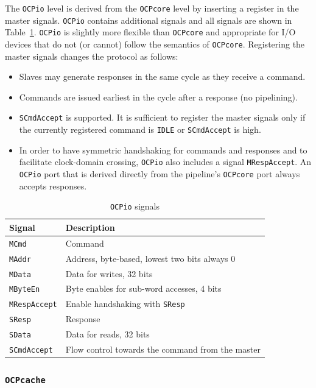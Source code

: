 \documentclass[a4paper,fontsize=10pt,twoside,DIV15,BCOR12mm,headinclude=true,footinclude=false,pagesize,bibtotoc]{scrbook}
\newcommand{\code}[1]{{\texttt{#1}}}
\begin{document}
The \code{OCPio} level is derived from the \code{OCPcore} level by
inserting a register in the master signals. \code{OCPio} contains
additional signals and all signals are shown in Table~\ref{tab:ocpiosignals}.
\code{OCPio} is slightly more
flexible than \code{OCPcore} and appropriate for I/O devices that do
not (or cannot) follow the semantics of \code{OCPcore}. Registering
the master signals changes the protocol as follows:
\begin{itemize}
\item Slaves may generate responses in the same cycle as they
  receive a command.
\item Commands are issued earliest in the cycle after a response (no
  pipelining).
\item \code{SCmdAccept} is supported. It is sufficient to register the
  master signals only if the currently registered command is
  \code{IDLE} or \code{SCmdAccept} is high.
\item In order to have symmetric handshaking for commands and
  responses and to facilitate clock-domain crossing, \code{OCPio} also
  includes a signal \code{MRespAccept}. An \code{OCPio} port that is
  derived directly from the pipeline's \code{OCPcore} port always
  accepts responses.
\end{itemize}

\begin{table}
  \centering
  \caption{\code{OCPio} signals}
  \label{tab:ocpiosignals}
  \begin{tabular}{ll}
    \toprule
    Signal & Description \\
    \midrule
    \code{MCmd} & Command \\
    \code{MAddr} & Address, byte-based, lowest two bits always 0 \\
    \code{MData} & Data for writes, 32 bits \\
    \code{MByteEn} & Byte enables for sub-word accesses, 4 bits \\
    \code{MRespAccept} & Enable handshaking with \code{SResp} \\
    \cmidrule{1-2}
    \code{SResp} & Response \\
    \code{SData} & Data for reads, 32 bits \\
    \code{SCmdAccept} & Flow control towards the command from the master \\
    \bottomrule
  \end{tabular}
\end{table}

\subsubsection{\code{OCPcache}}
\end{document}
